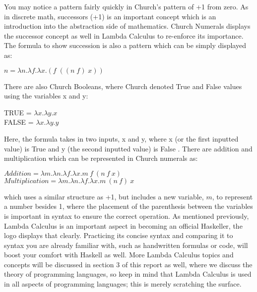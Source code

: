 \documentclass{article}
\begin{document}
\noindent
You may notice a pattern fairly quickly in Church's pattern of +1 from zero. As in discrete math, successors (+1) is an important concept which is an introduction into the abstraction side of mathematics. Church Numerals displays the successor concept as well in Lambda Calculus to re-enforce its importance. The formula to show succession is also a pattern which can be simply displayed as:

\begin{center}
   $ n = \lambda n. \lambda f. \lambda x.(f \; ((n \; f) \; x))$
\end{center}

\noindent 
There are also Church Booleans, where Church denoted True and False values using the variables x and y:

\begin{center}
    TRUE = $\lambda x.  \lambda y.x$ \\
    FALSE = $\lambda x.  \lambda y.y$ \\
\end{center}

\noindent
Here, the formula takes in two inputs, x and y, where x (or the first inputted value) is True and y (the second inputted value) is False \cite{CN}. There are addition and multiplication which can be represented in Church numerals as:

\begin{center}
 $ Addition = \lambda m.\lambda n.\lambda f.\lambda x.m\ f\ (n\ f\ x)$ \\
 $ Multiplication = \lambda m.\lambda n.\lambda f.\lambda x.m\ (n\ f) \ x $ \\
\end{center}
\noindent 
which uses a similar structure as +1, but includes a new variable, $m$, to represent a number besides 1, where the placement of the parenthesis between the variables is important in syntax to ensure the correct operation. As mentioned previously, Lambda Calculus is an important aspect in becoming an official Haskeller, the logo displays that clearly. Practicing its concise syntax and comparing it to syntax you are already familiar with, such as handwritten formulas or code, will boost your comfort with Haskell as well. More Lambda Calculus topics and concepts will be discussed in section 3 of this report as well, where we discuss the theory of programming languages, so keep in mind that Lambda Calculus is used in all aspects of programming languages; this is merely scratching the surface. 
\end{document}
